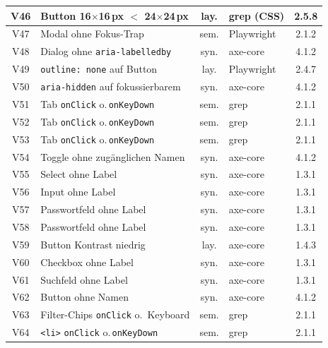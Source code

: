 \begin{longtable}{|c|p{5.8cm}|c|p{3.6cm}|c|}
V46  & Button 16$\times$16\,px $<$ 24$\times$24\,px & lay. & grep (CSS)     & 2.5.8 \\ \hline
V47  & Modal ohne Fokus-Trap                     & sem. & Playwright              & 2.1.2 \\ \hline
V48  & Dialog ohne \texttt{aria-labelledby}      & syn. & axe-core                & 4.1.2 \\ \hline
V49  & \texttt{outline: none} auf Button         & lay. & Playwright              & 2.4.7 \\ \hline
V50  & \texttt{aria-hidden} auf fokussierbarem   & syn. & axe-core                & 4.1.2 \\ \hline
V51  & Tab \texttt{onClick} o.\,\texttt{onKeyDown} & sem. & grep               & 2.1.1 \\ \hline
V52  & Tab \texttt{onClick} o.\,\texttt{onKeyDown} & sem. & grep               & 2.1.1 \\ \hline
V53  & Tab \texttt{onClick} o.\,\texttt{onKeyDown} & sem. & grep               & 2.1.1 \\ \hline
V54  & Toggle ohne zugänglichen Namen            & syn. & axe-core                & 4.1.2 \\ \hline
V55  & Select ohne Label                         & syn. & axe-core                & 1.3.1 \\ \hline
V56  & Input ohne Label                          & syn. & axe-core                & 1.3.1 \\ \hline
V57  & Passwortfeld ohne Label                   & syn. & axe-core                & 1.3.1 \\ \hline
V58  & Passwortfeld ohne Label                   & syn. & axe-core                & 1.3.1 \\ \hline
V59  & Button Kontrast niedrig                   & lay. & axe-core                & 1.4.3 \\ \hline
V60  & Checkbox ohne Label                       & syn. & axe-core                & 1.3.1 \\ \hline
V61  & Suchfeld ohne Label                       & syn. & axe-core                & 1.3.1 \\ \hline
V62  & Button ohne Namen                         & syn. & axe-core                & 4.1.2 \\ \hline
V63  & Filter-Chips \texttt{onClick} o.\ Keyboard & sem. & grep                 & 2.1.1 \\ \hline
V64  & \texttt{<li>} \texttt{onClick} o.\,\texttt{onKeyDown} & sem. & grep    & 2.1.1 \\ \hline

\end{longtable}
